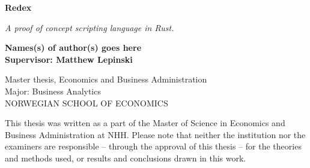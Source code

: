 
\begin{titlepage}
	
	
	\thispagestyle{frontpage}
	
	\begin{center}
		
		\vspace*{6\baselineskip}
	
		
		{\Huge \textbf{Redex\\}}
		
		\large{\textit{A proof of concept scripting language in Rust.}}\\
		
        \vspace*{1,5\baselineskip}

		\large{\textbf{Names(s) of author(s) goes here}}\\
		\large{\textbf{Supervisor: Matthew Lepinski}}\\
		
		\vspace{1,5\baselineskip}
		
		\large{Master thesis, Economics and Business
Administration}\\
		\large{Major: Business Analytics}\\
		
		\vspace{1,5\baselineskip}
		\large{NORWEGIAN SCHOOL OF ECONOMICS}\\

	\end{center}
	
	\vspace*{4\baselineskip}
	{This thesis was written as a part of the Master of Science in Economics and Business Administration at NHH. Please note that neither the institution nor the examiners are
responsible – through the approval of this thesis – for the theories and methods used, or
results and conclusions drawn in this work.}
	
\end{titlepage}